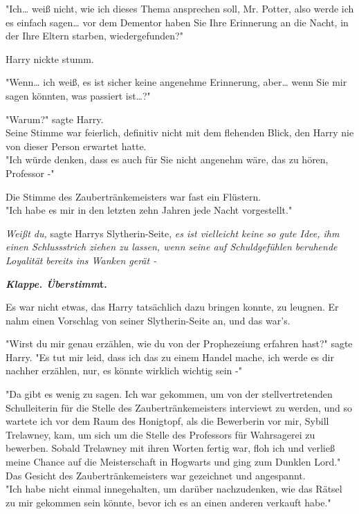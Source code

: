 {"Ich… weiß nicht, wie ich dieses Thema ansprechen soll, Mr. Potter, also werde ich es einfach sagen… vor dem Dementor haben Sie Ihre Erinnerung an die Nacht, in der Ihre Eltern starben, wiedergefunden?"

Harry nickte stumm.

"Wenn… ich weiß, es ist sicher keine angenehme Erinnerung, aber… wenn Sie mir sagen könnten, was passiert ist…?"

"Warum?" sagte Harry.\\ Seine Stimme war feierlich, definitiv nicht mit dem flehenden Blick, den Harry nie von dieser Person erwartet hatte.\\ "Ich würde denken, dass es auch für Sie nicht angenehm wäre, das zu hören, Professor -"

Die Stimme des Zaubertränkemeisters war fast ein Flüstern.\\ "Ich habe es mir in den letzten zehn Jahren jede Nacht vorgestellt."

\emph{Weißt du,} sagte Harrys Slytherin-Seite, \emph{es ist vielleicht keine so gute Idee, ihm einen Schlussstrich ziehen zu lassen, wenn seine auf Schuldgefühlen beruhende Loyalität} \emph{bereits ins Wanken gerät -}

\textbf{\emph{Klappe. Überstimm}t.}

Es war nicht etwas, das Harry tatsächlich dazu bringen konnte, zu leugnen. Er nahm einen Vorschlag von seiner Slytherin-Seite an, und das war's.

"Wirst du mir genau erzählen, wie du von der Prophezeiung erfahren hast?" sagte Harry. "Es tut mir leid, dass ich das zu einem Handel mache, ich werde es dir nachher erzählen, nur, es könnte wirklich wichtig sein -"

"Da gibt es wenig zu sagen. Ich war gekommen, um von der stellvertretenden Schulleiterin für die Stelle des Zaubertränkemeisters interviewt zu werden, und so wartete ich vor dem Raum des Honigtopf, als die Bewerberin vor mir, Sybill Trelawney, kam, um sich um die Stelle des Professors für Wahrsagerei zu bewerben. Sobald Trelawney mit ihren Worten fertig war, floh ich und verließ meine Chance auf die Meisterschaft in Hogwarts und ging zum Dunklen Lord."\\ Das Gesicht des Zaubertränkemeisters war gezeichnet und angespannt.\\ "Ich habe nicht einmal innegehalten, um darüber nachzudenken, wie das Rätsel zu mir gekommen sein könnte, bevor ich es an einen anderen verkauft habe."

}
